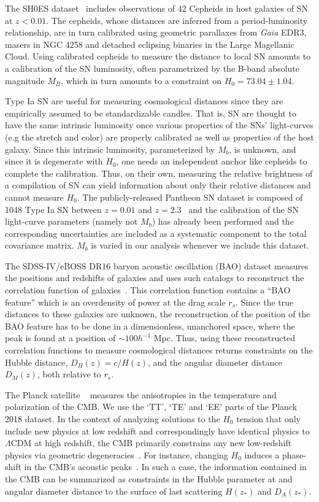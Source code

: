\documentclass[
 reprint,
 amsmath,amssymb,
 aps,
]{revtex4-2}
\begin{document}
The SH0ES dataset~\cite{Riess:2021jrx} includes observations of 42 Cepheids in host galaxies of SN at $z<0.01$.  The cepheids, whose distances are inferred from a period-luminosity relationship, are in turn calibrated using geometric parallaxes from \textit{Gaia} EDR3, masers in NGC 4258 and detached eclipsing binaries in the Large Magellanic Cloud. Using calibrated cepheids to measure the distance to local SN amounts to a calibration of the SN luminosity, often parametrized by the B-band absolute magnitude $M_B$, which in turn amounts to a constraint on $H_0 = 73.04 \pm 1.04$.

Type Ia SN are useful for measuring cosmological distances since they are empirically assumed to be standardizable candles. That is, SN are thought to have the same intrinsic luminosity once various properties of the SNs' light-curves (e.g the stretch and color) are properly calibrated as well as properties of the host galaxy.
Since this intrinsic luminosity, parameterized by $M_b$, is unknown, and since it is degenerate with $H_0$, one needs an independent anchor like cepheids to complete the calibration.  Thus, on their own, measuring the relative brightness of a compilation of SN can yield information about only their relative distances and cannot measure $H_0$. The publicly-released Pantheon SN dataset is composed of 1048 Type Ia SN between $z = 0.01$ and $z=2.3$~\cite{Pan-STARRS1:2017jku} and the calibration of the SN light-curve parameters (namely not $M_b$) has already been performed and the corresponding uncertainties are included as a systematic component to the total covariance matrix. $M_b$ is varied in our analysis whenever we include this dataset.


The SDSS-IV/eBOSS DR16 baryon acoustic oscillation (BAO) dataset measures the positions and redshifts of galaxies and uses such catalogs to reconstruct the correlation function of galaxies~\cite{eBOSS:2020yzd}. 
This correlation function contains a ``BAO feature'' which is an overdensity of power at the drag scale $r_s$. 
Since the true distances to these galaxies are unknown, the reconstruction of the position of the BAO feature has to be done in a dimensionless, unanchored space, where the peak is found at a position of $\sim 100 h^{-1}$ Mpc. Thus, using these reconstructed correlation functions to measure cosmological distances returns constraints on the Hubble distance, $D_H(z) = c/H(z)$, and the angular diameter distance $D_M(z)$, both relative to $r_s$.

The Planck satellite ~\cite{Planck:2018vyg} measures the anisotropies in the temperature and polarization of the CMB.  We use the `TT', `TE' and `EE' parts of the Planck 2018 dataset. In the context of analyzing solutions to the $H_0$ tension that only include new physics at low redshift and correspondingly have identical physics to $\Lambda$CDM at high redshift, the CMB primarily constrains any new low-redshift physics via geometric degeneracies~\cite{2019JCAP...12..035K}.  For instance, changing $H_0$ induces a phase-shift in the CMB's acoustic peaks~\cite{2020JCAP...09..055K}.  In such a case, the information contained in the CMB can be summarized as constraints in the Hubble parameter at and angular diameter distance to the surface of last scattering $H(z_*)$ and  $D_A(z_*)$.
\end{document}
